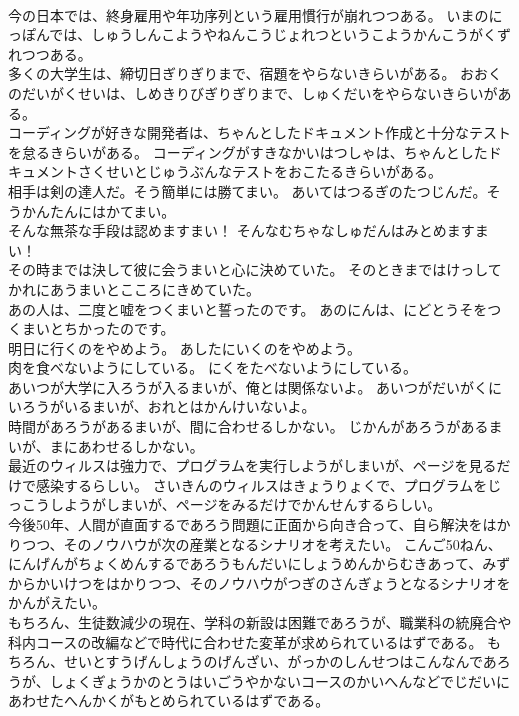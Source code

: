\documentclass[8pt]{extreport}
\begin{document}
\begin{CJK}{UTF8}{min}
\\	今の日本では、終身雇用や年功序列という雇用慣行が崩れつつある。	いまのにっぽんでは、しゅうしんこようやねんこうじょれつというこようかんこうがくずれつつある。 
\\	多くの大学生は、締切日ぎりぎりまで、宿題をやらないきらいがある。	おおくのだいがくせいは、しめきりびぎりぎりまで、しゅくだいをやらないきらいがある。 
\\	コーディングが好きな開発者は、ちゃんとしたドキュメント作成と十分なテストを怠るきらいがある。	コーディングがすきなかいはつしゃは、ちゃんとしたドキュメントさくせいとじゅうぶんなテストをおこたるきらいがある。 
\\	相手は剣の達人だ。そう簡単には勝てまい。	あいてはつるぎのたつじんだ。そうかんたんにはかてまい。 
\\	そんな無茶な手段は認めますまい！	そんなむちゃなしゅだんはみとめますまい！ 
\\	その時までは決して彼に会うまいと心に決めていた。	そのときまではけっしてかれにあうまいとこころにきめていた。 
\\	あの人は、二度と嘘をつくまいと誓ったのです。	あのにんは、にどとうそをつくまいとちかったのです。 
\\	明日に行くのをやめよう。	あしたにいくのをやめよう。 
\\	肉を食べないようにしている。	にくをたべないようにしている。 
\\	あいつが大学に入ろうが入るまいが、俺とは関係ないよ。	あいつがだいがくにいろうがいるまいが、おれとはかんけいないよ。 
\\	時間があろうがあるまいが、間に合わせるしかない。	じかんがあろうがあるまいが、まにあわせるしかない。 
\\	最近のウィルスは強力で、プログラムを実行しようがしまいが、ページを見るだけで感染するらしい。	さいきんのウィルスはきょうりょくで、プログラムをじっこうしようがしまいが、ページをみるだけでかんせんするらしい。 
\\	今後50年、人間が直面するであろう問題に正面から向き合って、自ら解決をはかりつつ、そのノウハウが次の産業となるシナリオを考えたい。	こんご50ねん、にんげんがちょくめんするであろうもんだいにしょうめんからむきあって、みずからかいけつをはかりつつ、そのノウハウがつぎのさんぎょうとなるシナリオをかんがえたい。 
\\	もちろん、生徒数減少の現在、学科の新設は困難であろうが、職業科の統廃合や科内コースの改編などで時代に合わせた変革が求められているはずである。	もちろん、せいとすうげんしょうのげんざい、がっかのしんせつはこんなんであろうが、しょくぎょうかのとうはいごうやかないコースのかいへんなどでじだいにあわせたへんかくがもとめられているはずである。 

\end{CJK}
\end{document}
